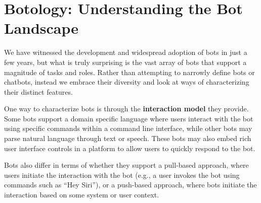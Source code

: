\documentclass{sig-alternate}
\newcommand{\cl}[1]{\textcolor{blue}{{\it [Carly says: #1]}}}
\begin{document}
\section{Botology: Understanding the Bot Landscape}


We have witnessed the development and widespread adoption of bots in just a few years, but what is truly surprising is the vast array of bots that support a magnitude of tasks and roles.  
Rather than attempting to narrowly define bots or chatbots, instead we embrace their diversity and look at ways of characterizing their distinct features.

One way to characterize bots is through the \textbf{interaction model} they provide. 
Some bots support a domain specific language where users interact with the bot using specific commands within a command line interface, while other bots may parse natural language through text or speech.  
These bots may also embed rich user interface controls in a platform to allow users to quickly respond to the bot.

Bots also differ in terms of whether they support a pull-based approach, where users initiate the interaction with the bot (e.g., a user invokes the bot using commands such as ``Hey Siri''), or a push-based approach, where bots initiate the interaction based on some system or user context. 
\end{document}
